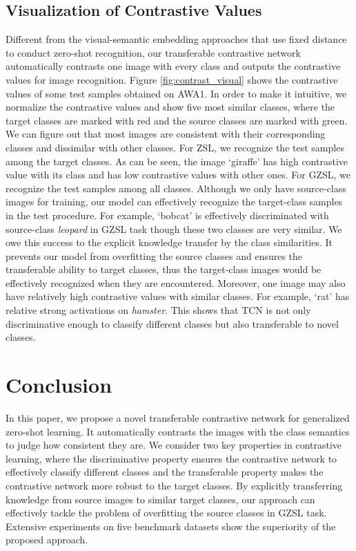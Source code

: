 \documentclass[10pt,twocolumn,letterpaper]{article}
\begin{document}
\subsection{Visualization of Contrastive Values}
Different from the visual-semantic embedding approaches that use fixed distance to conduct zero-shot recognition, our transferable contrastive network automatically contrasts one image with every class and outputs the contrastive values for image recognition. Figure \ref{fig:contrast_visual} shows the contrastive values of some test samples obtained on AWA1. In order to make it intuitive, we normalize the contrastive values and show five most similar classes, where the target classes are marked with red and the source classes are marked with green. We can figure out that most images are consistent with their corresponding classes and dissimilar with other classes. For ZSL, we recognize the test samples among the target classes. As can be seen, the image `giraffe' has high contrastive value with its class and has low contrastive values with other ones. For GZSL, we recognize the test samples among all classes. Although we only have source-class images for training, our model can effectively recognize the target-class samples in the test procedure. For example, `bobcat' is effectively discriminated with source-class \emph{leopard} in GZSL task though these two classes are very similar. We owe this success to the explicit knowledge transfer by the class similarities. It prevents our model from overfitting the source classes and ensures the transferable ability to target classes, thus the target-class images would be effectively recognized when they are encountered. Moreover, one image may also have relatively high contrastive values with similar classes. For example, `rat' has relative strong activations on \emph{hamster}. This shows that TCN is not only discriminative enough to classify different classes but also transferable to novel classes.

\section{Conclusion}

In this paper, we propose a novel transferable contrastive network for generalized zero-shot learning. It automatically contrasts the images with the class semantics to judge how consistent they are. We consider two key properties in contrastive learning, where the discriminative property ensures the contrastive network to effectively classify different classes and the transferable property makes the contrastive network more robust to the target classes. By explicitly transferring knowledge from source images to similar target classes, our approach can effectively tackle the problem of overfitting the source classes in GZSL task. Extensive experiments on five benchmark datasets show the superiority of the proposed approach.
\end{document}
